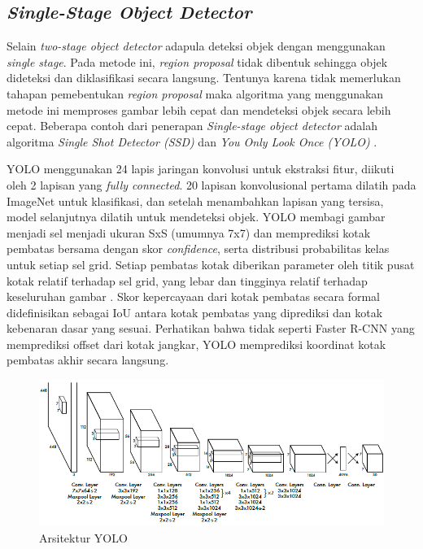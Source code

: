\subsection{\textit{Single-Stage Object Detector}}
Selain \textit{two-stage object detector} adapula deteksi objek dengan menggunakan \textit{single stage}.
Pada metode ini, \textit{region proposal} tidak dibentuk sehingga objek dideteksi dan diklasifikasi
secara langsung. Tentunya karena tidak memerlukan tahapan pemebentukan \textit{region proposal} maka
algoritma yang menggunakan metode ini memproses gambar lebih cepat dan mendeteksi objek secara lebih cepat.
Beberapa contoh dari penerapan \textit{Single-stage object detector} adalah algoritma 
\textit{Single Shot Detector (SSD)} dan \textit{You Only Look Once (YOLO)} 
\cite{https://doi.org/10.48550/arxiv.1506.02640}. 

YOLO menggunakan 24 lapis jaringan konvolusi untuk ekstraksi fitur, diikuti oleh 2 lapisan yang 
\textit{fully connected}. 20 lapisan konvolusional pertama dilatih pada ImageNet untuk klasifikasi, 
dan setelah menambahkan lapisan yang tersisa, model selanjutnya dilatih untuk mendeteksi objek. 
YOLO membagi gambar menjadi sel menjadi ukuran SxS (umumnya 7x7) dan memprediksi kotak pembatas 
bersama dengan skor \textit{confidence}, serta distribusi probabilitas kelas untuk setiap sel grid. 
Setiap pembatas kotak diberikan parameter oleh titik pusat kotak relatif terhadap sel grid, yang
lebar dan tingginya relatif terhadap keseluruhan gambar \cite{hawking1988}. Skor kepercayaan dari kotak pembatas secara 
formal didefinisikan sebagai IoU antara kotak pembatas yang diprediksi dan
kotak kebenaran dasar yang sesuai. Perhatikan bahwa tidak seperti Faster R-CNN yang memprediksi 
offset dari kotak jangkar, YOLO memprediksi koordinat kotak pembatas akhir secara langsung.

\begin{figure}[h!]
    \begin{center}
      \includegraphics[width= 1\linewidth]{bab2/Yolo Archi.png}
      \caption{Arsitektur YOLO \cite{YOLOYOLA}}
      \label{fig: Archi YOLO}
    \end{center}
\end{figure}

